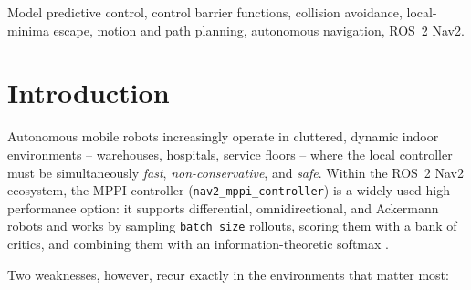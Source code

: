 \documentclass[journal]{IEEEtran}
\begin{document}
\begin{IEEEkeywords}
Model predictive control, control barrier functions, collision avoidance,
local-minima escape, motion and path planning, autonomous navigation,
ROS~2 Nav2.
\end{IEEEkeywords}

\section{Introduction}
\label{sec:intro}

Autonomous mobile robots increasingly operate in cluttered, dynamic indoor
environments -- warehouses, hospitals, service floors -- where the local
controller must be simultaneously \emph{fast}, \emph{non-conservative}, and
\emph{safe}. Within the ROS~2 Nav2 ecosystem, the MPPI controller
(\texttt{nav2\_mppi\_controller}) \cite{nav2} is a widely used
high-performance option: it supports differential, omnidirectional, and
Ackermann robots and works by sampling \texttt{batch\_size}
rollouts, scoring them with a bank of critics, and combining them with an
information-theoretic softmax \cite{mppi_orig}.

Two weaknesses, however, recur exactly in the environments that matter
most:
\end{document}
